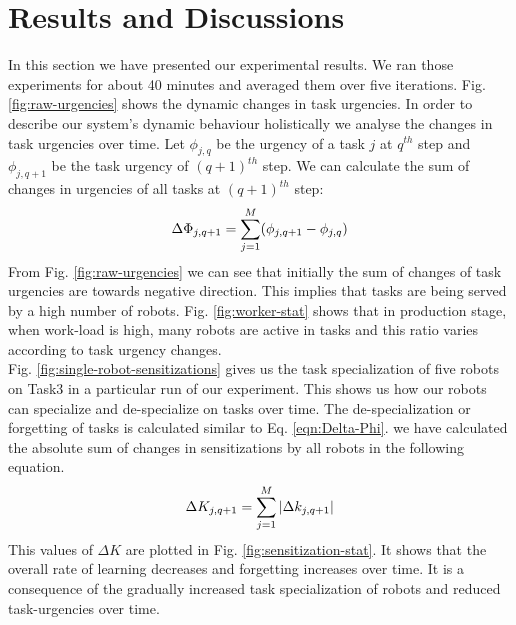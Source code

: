 \documentclass{llncs}
\begin{document}
\section{Results and Discussions}
\label{sec:results}
In this section we have presented our experimental results. We ran those experiments for about 40 minutes and averaged them over five iterations.
Fig. \ref{fig:raw-urgencies} shows the dynamic changes in task urgencies.  In order to describe our system's dynamic behaviour holistically we analyse the changes in task urgencies over time. Let $ \phi_{j, q}$ be the urgency of a task $j$ at $q^{th}$ step and $\phi_{j, q+1}$ be the task urgency of $(q+1)^{th}$ step. We can calculate the sum of changes in urgencies of all tasks at $(q+1)^{th}$ step:
\begin{equation} 
\small
\Delta \Phi_{j, q+1} = \sum_{j=1}^{M} (\phi_{j, q+1} - \phi_{j, q})
\label{eqn:Delta-Phi}
\end{equation}
From Fig. \ref{fig:raw-urgencies} we can see that initially the sum of changes of task urgencies are towards negative direction. This implies that tasks are being served by a high number of robots. Fig. \ref{fig:worker-stat} shows that in production stage, when  work-load is high, many robots are active in tasks and this ratio varies according to task urgency changes.\\ 
Fig. \ref{fig:single-robot-sensitizations} gives us the task specialization of five robots on Task3 in a particular run of our experiment. This shows us how our robots can specialize and de-specialize on tasks over time. The de-specialization or forgetting of tasks is calculated similar to Eq. \ref{eqn:Delta-Phi}. we have calculated the absolute sum of changes in sensitizations by all robots in the following equation.
% 
\begin{equation}
\small 
\Delta K_{j, q+1} = \sum_{j=1}^{M} \left | \Delta k_{j, q+1} \right |
\label{eqn:Delta-K}
\end{equation}
This values of $\Delta K$ are plotted in Fig. \ref{fig:sensitization-stat}. It shows that the overall rate of learning decreases and forgetting increases over time. It is a consequence of the gradually increased task specialization of robots and reduced task-urgencies over time.
\end{document}
